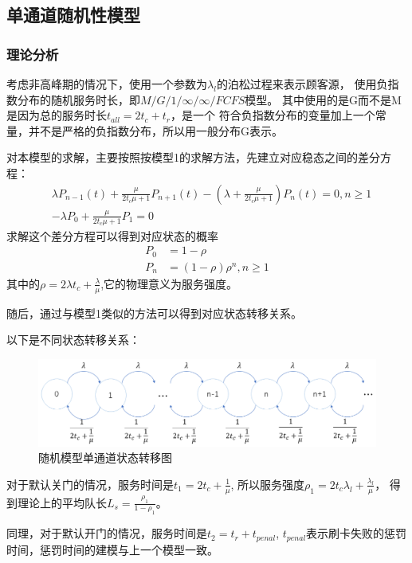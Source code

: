 \subsection{单通道随机性模型}
\subsubsection{理论分析}
考虑非高峰期的情况下，使用一个参数为$\lambda_{l}$的泊松过程来表示顾客源，
使用负指数分布的随机服务时长，即$M/G/1/\infty/\infty/FCFS$模型。
其中使用的是G而不是M是因为总的服务时长$t_{all}=2t_{c}+t_{r}$，是一个
符合负指数分布的变量加上一个常量，并不是严格的负指数分布，所以用一般分布G表示。

\par 对本模型的求解，主要按照按模型1的求解方法，先建立对应稳态之间的差分方程：
\begin{equation}
    \begin{aligned}
        & \lambda P_{n-1}(t)+\frac{\mu}{2t_c\mu+1} P_{n+1}(t)-(\lambda+\frac{\mu}{2t_c\mu+1} )P_n(t)=0,n\geq 1 \\
        & -\lambda P_{0}+\frac{\mu}{2t_c\mu+1} P_{1}=0
    \end{aligned}
\end{equation}
求解这个差分方程可以得到对应状态的概率
\begin{equation}
    \begin{aligned}
        P_0 &=1-\rho \\
        P_n &=(1-\rho)\rho^n,n\geq1
    \end{aligned}
\end{equation}
其中的$\rho=2\lambda t_c+\frac{\lambda}{\mu}$,它的物理意义为服务强度。

随后，通过与模型1类似的方法可以得到对应状态转移关系。

以下是不同状态转移关系：
\begin{figure}[ht]
    \centering
    \includegraphics[width=.6\textwidth]{images/transform2.PNG}
    \caption{随机模型单通道状态转移图}
    \label{fig:transform2}
\end{figure}

\par 对于默认关门的情况，服务时间是$t_1=2t_c+\frac{1}{\mu}$,
所以服务强度$\rho_1=2t_c\lambda_l+\frac{\lambda_l}{\mu}$，
得到理论上的平均队长$L_s=\frac{\rho_1}{1-\rho_1}$。
\par 同理，对于默认开门的情况，服务时间是$t_2=t_r+t_{penal}$,
$t_{penal}$表示刷卡失败的惩罚时间，惩罚时间的建模与上一个模型一致。

